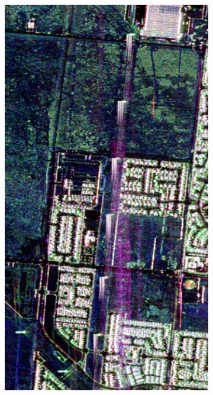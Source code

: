 \begin{figure}[t]
\begin{subfigure}[b]{0.23\columnwidth}
		\includegraphics[width=\textwidth]{Figures/CD/A2_2015}
		\caption{}
		\label{fig:3_b}
\end{subfigure}
\hspace{0.01pt}
\begin{subfigure}[b]{0.23\columnwidth}

\end{subfigure}
\end{figure}
